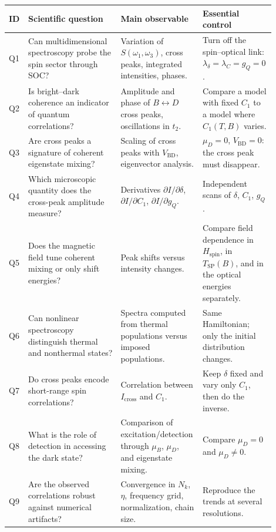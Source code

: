 \documentclass[11pt]{article}
\begin{document}
\begin{longtable}{>{\centering\arraybackslash}p{0.07\linewidth} p{0.34\linewidth} p{0.27\linewidth} p{0.22\linewidth}}
\toprule
ID & Scientific question & Main observable & Essential control \\
\midrule
\endhead
Q1 & Can multidimensional spectroscopy probe the spin sector through SOC? & Variation of \(S(\omega_1,\omega_3)\), cross peaks, integrated intensities, phases. & Turn off the spin--optical link: \(\lambda_\delta=\lambda_C=g_Q=0\). \\
Q2 & Is bright--dark coherence an indicator of quantum correlations? & Amplitude and phase of \(B\leftrightarrow D\) cross peaks, oscillations in \(t_2\). & Compare a model with fixed \(C_1\) to a model where \(C_1(T,B)\) varies. \\
Q3 & Are cross peaks a signature of coherent eigenstate mixing? & Scaling of cross peaks with \(V_{\mathrm{BD}}\), eigenvector analysis. & \(\mu_D=0\), \(V_{\mathrm{BD}}=0\): the cross peak must disappear. \\
Q4 & Which microscopic quantity does the cross-peak amplitude measure? & Derivatives \(\partial I/\partial \delta\), \(\partial I/\partial C_1\), \(\partial I/\partial g_Q\). & Independent scans of \(\delta\), \(C_1\), \(g_Q\). \\
Q5 & Does the magnetic field tune coherent mixing or only shift energies? & Peak shifts versus intensity changes. & Compare field dependence in \(H_{\mathrm{spin}}\), in \(T_{\mathrm{SP}}(B)\), and in the optical energies separately. \\
Q6 & Can nonlinear spectroscopy distinguish thermal and nonthermal states? & Spectra computed from thermal populations versus imposed populations. & Same Hamiltonian; only the initial distribution changes. \\
Q7 & Do cross peaks encode short-range spin correlations? & Correlation between \(I_{\mathrm{cross}}\) and \(C_1\). & Keep \(\delta\) fixed and vary only \(C_1\), then do the inverse. \\
Q8 & What is the role of detection in accessing the dark state? & Comparison of excitation/detection through \(\mu_B\), \(\mu_D\), and eigenstate mixing. & Compare \(\mu_D=0\) and \(\mu_D\neq0\). \\
Q9 & Are the observed correlations robust against numerical artifacts? & Convergence in \(N_k\), \(\eta\), frequency grid, normalization, chain size. & Reproduce the trends at several resolutions. \\
\bottomrule
\end{longtable}
\end{document}
